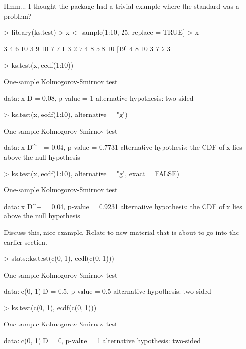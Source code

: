 Hmm... I thought the package had a trivial example where the standard
 was a problem?
\begin{Schunk}
\begin{Sinput}
> library(ks.test)
> x <- sample(1:10, 25, replace = TRUE)
> x
\end{Sinput}
\begin{Soutput}
 [1]  3  4  6 10  3  9 10  7  7  1  3  2  7  4  8  5  8 10
[19]  4  8 10  3  7  2  3
\end{Soutput}
\begin{Sinput}
> ks.test(x, ecdf(1:10))
\end{Sinput}
\begin{Soutput}
	One-sample Kolmogorov-Smirnov test

data:  x 
D = 0.08, p-value = 1
alternative hypothesis: two-sided 
\end{Soutput}
\begin{Sinput}
> ks.test(x, ecdf(1:10), alternative = "g")
\end{Sinput}
\begin{Soutput}
	One-sample Kolmogorov-Smirnov test

data:  x 
D^+ = 0.04, p-value = 0.7731
alternative hypothesis: the CDF of x lies above the null hypothesis 
\end{Soutput}
\begin{Sinput}
> ks.test(x, ecdf(1:10), alternative = "g", exact = FALSE)
\end{Sinput}
\begin{Soutput}
	One-sample Kolmogorov-Smirnov test

data:  x 
D^+ = 0.04, p-value = 0.9231
alternative hypothesis: the CDF of x lies above the null hypothesis 
\end{Soutput}
\end{Schunk}

Discuss this, nice example.  Relate to new material that is about to go into
the earlier section.
\begin{Schunk}
\begin{Sinput}
> stats::ks.test(c(0, 1), ecdf(c(0, 1)))
\end{Sinput}
\begin{Soutput}
	One-sample Kolmogorov-Smirnov test

data:  c(0, 1) 
D = 0.5, p-value = 0.5
alternative hypothesis: two-sided 
\end{Soutput}
\begin{Sinput}
> ks.test(c(0, 1), ecdf(c(0, 1)))
\end{Sinput}
\begin{Soutput}
	One-sample Kolmogorov-Smirnov test

data:  c(0, 1) 
D = 0, p-value = 1
alternative hypothesis: two-sided 
\end{Soutput}
\end{Schunk}

